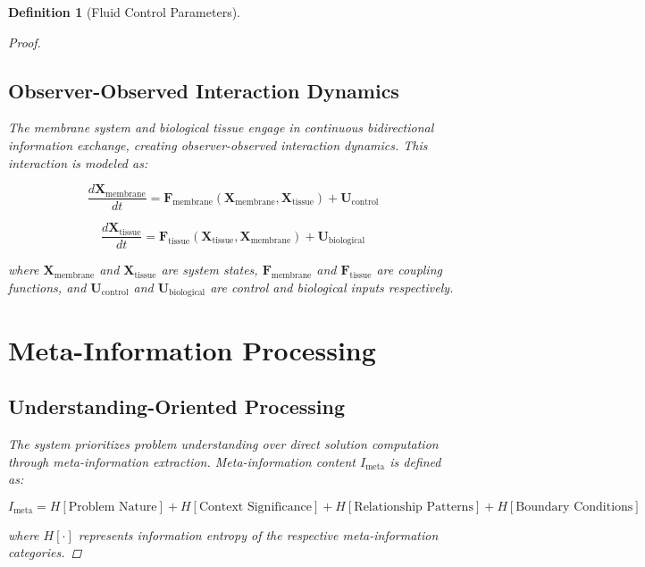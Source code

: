 \documentclass[12pt,a4paper]{article}
\newtheorem{definition}{Definition}
\begin{document}
\begin{definition}[Fluid Control Parameters]
\begin{proof}
\subsection{Observer-Observed Interaction Dynamics}

The membrane system and biological tissue engage in continuous bidirectional information exchange, creating observer-observed interaction dynamics. This interaction is modeled as:

\begin{equation}
\frac{d\mathbf{X}_{\text{membrane}}}{dt} = \mathbf{F}_{\text{membrane}}(\mathbf{X}_{\text{membrane}}, \mathbf{X}_{\text{tissue}}) + \mathbf{U}_{\text{control}}
\end{equation}

\begin{equation}
\frac{d\mathbf{X}_{\text{tissue}}}{dt} = \mathbf{F}_{\text{tissue}}(\mathbf{X}_{\text{tissue}}, \mathbf{X}_{\text{membrane}}) + \mathbf{U}_{\text{biological}}
\end{equation}

where $\mathbf{X}_{\text{membrane}}$ and $\mathbf{X}_{\text{tissue}}$ are system states, $\mathbf{F}_{\text{membrane}}$ and $\mathbf{F}_{\text{tissue}}$ are coupling functions, and $\mathbf{U}_{\text{control}}$ and $\mathbf{U}_{\text{biological}}$ are control and biological inputs respectively.

\section{Meta-Information Processing}

\subsection{Understanding-Oriented Processing}

The system prioritizes problem understanding over direct solution computation through meta-information extraction. Meta-information content $I_{\text{meta}}$ is defined as:

\begin{equation}
I_{\text{meta}} = H[\text{Problem Nature}] + H[\text{Context Significance}] + H[\text{Relationship Patterns}] + H[\text{Boundary Conditions}]
\end{equation}

where $H[\cdot]$ represents information entropy of the respective meta-information categories.


\end{proof}
\end{definition}
\end{document}
